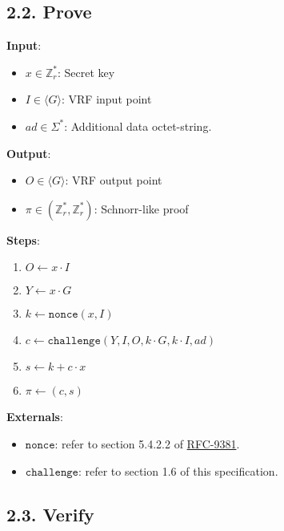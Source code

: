 \documentclass[
]{article}
\providecommand{\tightlist}{%
  \setlength{\itemsep}{0pt}\setlength{\parskip}{0pt}}
\begin{document}
\hypertarget{prove}{%
\subsection{2.2. Prove}\label{prove}}

\textbf{Input}:

\begin{itemize}
\tightlist
\item
  \(x \in \mathbb{Z}^*_r\): Secret key
\item
  \(I \in \langle G \rangle\): VRF input point
\item
  \(ad \in \Sigma^*\): Additional data octet-string.
\end{itemize}

\textbf{Output}:

\begin{itemize}
\tightlist
\item
  \(O \in \langle G \rangle\): VRF output point
\item
  \(\pi \in (\mathbb{Z}^*_r, \mathbb{Z}^*_r)\): Schnorr-like proof
\end{itemize}

\textbf{Steps}:

\begin{enumerate}
\def\labelenumi{\arabic{enumi}.}
\tightlist
\item
  \(O \gets x \cdot I\)
\item
  \(Y \gets x \cdot G\)
\item
  \(k \gets \texttt{nonce}(x, I)\)
\item
  \(c \gets \texttt{challenge}(Y, I, O, k \cdot G, k \cdot I, ad)\)
\item
  \(s \gets k + c \cdot x\)
\item
  \(\pi \gets (c, s)\)
\end{enumerate}

\textbf{Externals}:

\begin{itemize}
\tightlist
\item
  \(\texttt{nonce}\): refer to section 5.4.2.2 of
  \href{https://datatracker.ietf.org/doc/rfc9381}{RFC-9381}.
\item
  \(\texttt{challenge}\): refer to section 1.6 of this specification.
\end{itemize}

\hypertarget{verify}{%
\subsection{2.3. Verify}\label{verify}}
\end{document}
